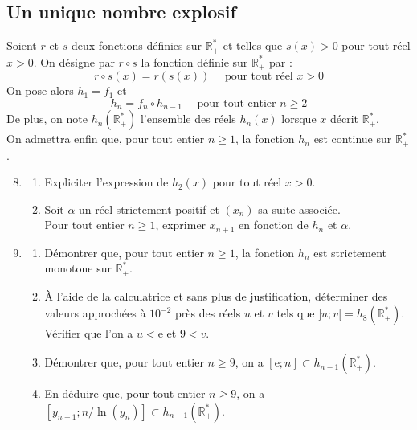 \documentclass[landscape,twocolumn,leqno,a4paper,10pt]{report} %
\newcommand\n{\noindent}
\newcommand\q{\quad}
\renewcommand{\geq}{\geqslant}
\newcommand{\e}{\mathrm{e}}
\begin{document}
\subsection{Un unique nombre explosif}

\n Soient $r$ et $s$ deux fonctions définies sur $\mathbb{R}_{+}^{*}$ et telles que $s(x)>0$ pour tout réel $x>0$. On désigne par $r \circ s$ la fonction définie sur $\mathbb{R}_{+}^{*}$ par :
$$r \circ s(x)=r(s(x)) \q\text { pour tout réel } x>0$$
On pose alors $h_{1}=f_{1}$ et 
$$h_{n}=f_{n} \circ h_{n-1} \q\text { pour tout entier } n \geq 2$$
De plus, on note $h_{n}\left(\mathbb{R}_{+}^{*}\right)$ l'ensemble des réels $h_{n}(x)$ lorsque $x$ décrit $\mathbb{R}_{+}^{*}$.\\

\n On admettra enfin que, pour tout entier $n \geq 1$, la fonction $h_{n}$ est continue sur $\mathbb{R}_{+}^{*}$.

\begin{enumerate}\setcounter{enumi}{7}
	\item \begin{enumerate}
		\item Expliciter l'expression de $h_{2}(x)$ pour tout réel $x>0$.
		\item Soit $\alpha$ un réel strictement positif et $\left(x_{n}\right)$ sa suite associée.\\
		Pour tout entier $n \geq 1$, exprimer $x_{n+1}$ en fonction de $h_{n}$ et $\alpha$.
	\end{enumerate}	 
	\item \begin{enumerate}
		\item Démontrer que, pour tout entier $n \geq 1$, la fonction $h_{n}$ est strictement monotone sur $\mathbb{R}_{+}^{*}$.
		\item À l'aide de la calculatrice et sans plus de justification, déterminer des valeurs approchées à $10^{-2}$ près des réels $u$ et $v$ tels que $]u ; v[=h_{8}\left(\mathbb{R}_{+}^{*}\right)$.\\
		Vérifier que l'on a $u<\e$ et $9<v$.
		\item Démontrer que, pour tout entier $n \geq 9$, on a $[\e ; n] \subset h_{n-1}\left(\mathbb{R}_{+}^{*}\right)$.
		\item En déduire que, pour tout entier $n \geq 9$, on a $\left[y_{n-1} ; n / \ln \left(y_{n}\right)\right] \subset h_{n-1}\left(\mathbb{R}_{+}^{*}\right)$.
	\end{enumerate}
\end{enumerate}
\end{document}
